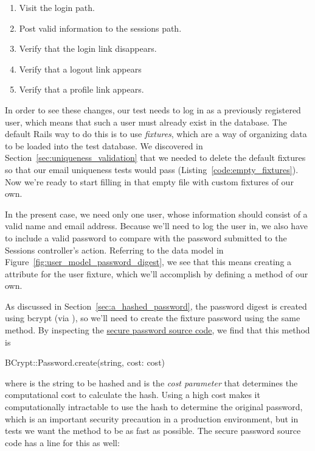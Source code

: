 \begin{enumerate}
\item Visit the login path.
\item Post valid information to the sessions path.
\item Verify that the login link disappears.
\item Verify that a logout link appears
\item Verify that a profile link appears.
\end{enumerate}

In order to see these changes, our test needs to log in as a previously registered user, which means that such a user must already exist in the database. The default Rails way to do this is to use \emph{fixtures}, which are a way of organizing data to be loaded into the test database. We discovered in Section~\ref{sec:uniqueness_validation} that we needed to delete the default fixtures so that our email uniqueness tests would pass (Listing~\ref{code:empty_fixtures}). Now we're ready to start filling in that empty file with custom fixtures of our own.

In the present case, we need only one user, whose information should consist of a valid name and email address. Because we'll need to log the user in, we also have to include a valid password to compare with the password submitted to the Sessions controller's  action. Referring to the data model in Figure~\ref{fig:user_model_password_digest}, we see that this means creating a  attribute for the user fixture, which we'll accomplish by defining a  method of our own.

As discussed in Section~\ref{sec:a_hashed_password}, the password digest is created using bcrypt (via ), so we'll need to create the fixture password using the same method. By inspecting the \href{https://github.com/rails/rails/blob/master/activemodel/lib/active_model/secure_password.rb}{secure password source code}, we find that this method is

\begin{code}
BCrypt::Password.create(string, cost: cost)
\end{code}

\noindent where  is the string to be hashed and  is the \emph{cost parameter} that determines the computational cost to calculate the hash. Using a high cost makes it computationally intractable to use the hash to determine the original password, which is an important security precaution in a production environment, but in tests we want the  method to be as fast as possible. The secure password source code has a line for this as well:

